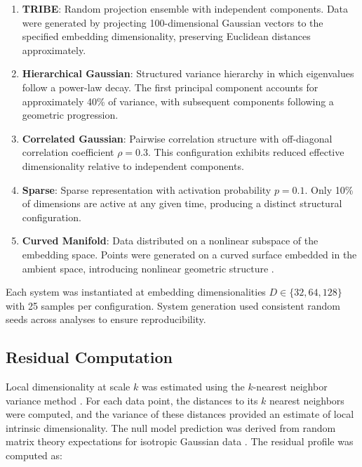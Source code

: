 \begin{enumerate}
	\item \textbf{TRIBE}: Random projection ensemble with independent components. Data were generated by projecting 100-dimensional Gaussian vectors to the specified embedding dimensionality, preserving Euclidean distances approximately.

	\item \textbf{Hierarchical Gaussian}: Structured variance hierarchy in which eigenvalues follow a power-law decay. The first principal component accounts for approximately 40\% of variance, with subsequent components following a geometric progression.

	\item \textbf{Correlated Gaussian}: Pairwise correlation structure with off-diagonal correlation coefficient $\rho = 0.3$. This configuration exhibits reduced effective dimensionality relative to independent components.

	\item \textbf{Sparse}: Sparse representation with activation probability $p = 0.1$. Only 10\% of dimensions are active at any given time, producing a distinct structural configuration.

	\item \textbf{Curved Manifold}: Data distributed on a nonlinear subspace of the embedding space. Points were generated on a curved surface embedded in the ambient space, introducing nonlinear geometric structure \citep{tenenbaum2000global}.
\end{enumerate}

Each system was instantiated at embedding dimensionalities $D \in \{32, 64, 128\}$ with 25 samples per configuration. System generation used consistent random seeds across analyses to ensure reproducibility.

\subsection{Residual Computation}

Local dimensionality at scale $k$ was estimated using the $k$-nearest neighbor variance method \citep{levina2005maximum}. For each data point, the distances to its $k$ nearest neighbors were computed, and the variance of these distances provided an estimate of local intrinsic dimensionality. The null model prediction was derived from random matrix theory expectations for isotropic Gaussian data \citep{marchenko1967distribution}. The residual profile was computed as:

